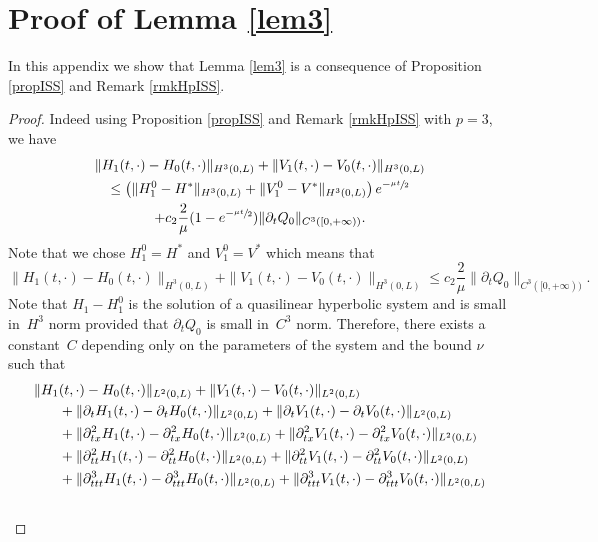 \section{Proof of Lemma \ref{lem3}}\label{app:prooflem3}
In this appendix we show that Lemma \ref{lem3} is a consequence of Proposition \ref{propISS} and Remark \ref{rmkHpISS}.
\begin{proof}
Indeed using Proposition \ref{propISS} and Remark \ref{rmkHpISS} with $p=3$, we have
\begin{multline*}
\|H_{1}(t,\cdot)-H_{0}(t,\cdot)\|_{H^{3}(0,L)}+\|V_{1}(t,\cdot)-V_{0}(t,\cdot)\|_{H^{3}(0,L)}\\
\leq \left(\|H_{1}^{0}-H^{*}\|_{H^{3}(0,L)}+\|V_{1}^{0}-V^{*}\|_{H^{3}(0,L)}\right)e^{-\sfrac{\mu t}{2}}\\
+c_{2} \frac{2}{\mu}(1-e^{-\sfrac{\mu t}{2}}) \|\partial_{t}Q_{0}\|_{C^{3}([0,+\infty))}.
\end{multline*}
Note that we chose $H_{1}^{0} = H^{*}$ and $V_{1}^{0} = V^{*}$ which means that
\begin{equation}\label{estimlemma1}
\|H_{1}(t,\cdot)-H_{0}(t,\cdot)\|_{H^{3}(0,L)}+\|V_{1}(t,\cdot)-V_{0}(t,\cdot)\|_{H^{3}(0,L)}\leq c_{2} \frac{2}{\mu}\|\partial_{t}Q_{0}\|_{C^{3}([0,+\infty))}.
\end{equation}
Note that $H_{1}-H_{1}^{0}$ is the solution of a quasilinear hyperbolic system and is small in~$H^{3}$ norm provided that $\partial_{t}Q_{0}$ is small in~$C^{3}$ norm. Therefore, there exists a constant~$C$ depending only on the parameters of the system and the bound $\nu$ such that
\begin{align}
\label{estimlemma2}
\|H_{1}&(t,\cdot)-H_{0}(t,\cdot)\|_{L^{2}(0,L)}+\|V_{1}(t,\cdot)-V_{0}(t,\cdot)\|_{L^{2}(0,L)}\\\notag
&+\|\partial_{t}H_{1}(t,\cdot)-\partial_{t}H_{0}(t,\cdot)\|_{L^{2}(0,L)}+\|\partial_{t}V_{1}(t,\cdot)-\partial_{t}V_{0}(t,\cdot)\|_{L^{2}(0,L)}\\\notag
&+\|\partial_{tx}^{2}H_{1}(t,\cdot)-\partial_{tx}^{2}H_{0}(t,\cdot)\|_{L^{2}(0,L)}+\|\partial_{tx}^{2}V_{1}(t,\cdot)-\partial_{tx}^{2}V_{0}(t,\cdot)\|_{L^{2}(0,L)}\\\notag
&+\|\partial_{tt}^{2}H_{1}(t,\cdot)-\partial_{tt}^{2}H_{0}(t,\cdot)\|_{L^{2}(0,L)}+\|\partial_{tt}^{2}V_{1}(t,\cdot)-\partial_{tt}^{2}V_{0}(t,\cdot)\|_{L^{2}(0,L)}\\\notag
&+\|\partial_{ttt}^{3}H_{1}(t,\cdot)-\partial_{ttt}^{3}H_{0}(t,\cdot)\|_{L^{2}(0,L)}+\|\partial_{ttt}^{3}V_{1}(t,\cdot)-\partial_{ttt}^{3}V_{0}(t,\cdot)\|_{L^{2}(0,L)}\\\notag

\end{align}
\end{proof}
